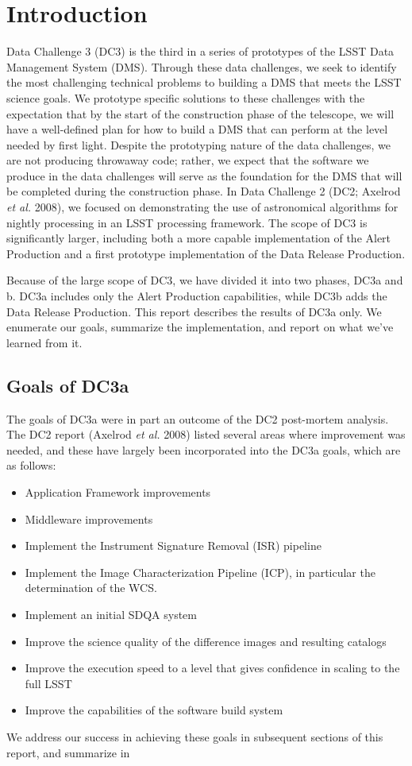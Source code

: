 
\section{Introduction}

Data Challenge 3 (DC3) is the third in a series of prototypes of the
LSST Data Management System (DMS). Through these data challenges, we
seek to identify the most challenging technical problems to building a
DMS that meets the LSST science goals. We prototype specific solutions
to these challenges with the expectation that by the start of the
construction phase of the telescope, we will have a well-defined plan
for how to build a DMS that can perform at the level needed by first
light. Despite the prototyping nature of the data challenges, we are
not producing throwaway code; rather, we expect that the software we
produce in the data challenges will serve as the foundation for the
DMS that will be completed during the construction phase.  In Data
Challenge 2 (DC2; Axelrod {\it et al.} 2008), we focused on
demonstrating the use of astronomical algorithms for nightly
processing in an LSST processing framework.  The scope of DC3 is
significantly larger, including both a more capable implementation of
the Alert Production and a first prototype implementation of the Data
Release Production.

Because of the large scope of DC3, we have divided it into two phases,
DC3a and b.  DC3a includes only the Alert Production capabilities,
while DC3b adds the Data Release Production.  This report describes
the results of DC3a only. We enumerate our goals, summarize the
implementation, and report on what we've learned from it.

\subsection{Goals of DC3a}

The goals of DC3a were in part an outcome of the DC2 post-mortem
analysis.  The DC2 report (Axelrod {\it et al.} 2008) listed several
areas where improvement was needed, and these have largely been
incorporated into the DC3a goals, which are as follows:

\begin{itemize}
\item Application Framework improvements
\item Middleware improvements
\item Implement the Instrument Signature Removal (ISR) pipeline
\item Implement the Image Characterization Pipeline (ICP), in
  particular the determination of the WCS.
\item Implement an initial SDQA system
\item Improve the science quality of the difference images and
  resulting catalogs
\item Improve the execution speed to a level that gives confidence in
  scaling to the full LSST
\item Improve the capabilities of the software build system
\end{itemize}

We address our success in achieving these goals in subsequent sections
of this report, and summarize in 
